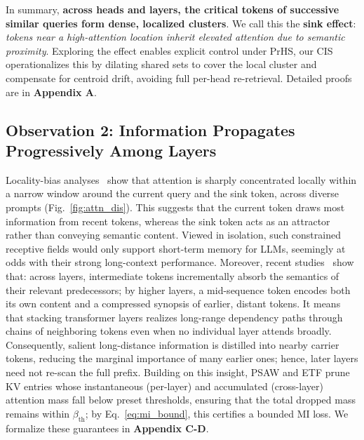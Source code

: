 In summary, \textbf{across heads and layers, the critical tokens of successive similar queries form dense, localized clusters}. We call this the \textbf{sink effect}: \textit{tokens near a high-attention location inherit elevated attention due to semantic proximity}. Exploring the effect enables explicit control under PrHS, our CIS operationalizes this by dilating shared sets to cover the local cluster and compensate for centroid drift, avoiding full per-head re-retrieval. Detailed proofs are in \textbf{Appendix A}.



\subsection{Observation 2: Information Propagates Progressively Among Layers}

Locality-bias analyses~\cite{zhang2023h2o,ge2023fastgen} show that attention is
sharply concentrated locally within a narrow window around the current query
and the sink token, across diverse prompts (Fig.~\ref{fig:attn_dis}).
This suggests that the current token draws most information from recent tokens,
whereas the sink token acts as an attractor rather than conveying semantic content.
Viewed in isolation, such constrained receptive fields would only support short-term memory for LLMs, seemingly at odds with their strong long-context performance.
Moreover, recent studies~\cite{cai2024pyramidkv,wan2024d2o,gao2023empower} show that:
across layers, intermediate tokens incrementally absorb the semantics of their relevant predecessors; by higher layers, a mid-sequence token encodes both its own content and a compressed synopsis of earlier, distant tokens.
It means that stacking transformer layers realizes long-range dependency paths through chains of neighboring tokens even when no individual layer attends broadly.
Consequently, salient long-distance information is distilled into nearby carrier
tokens, reducing the marginal importance of many earlier ones; hence,
later layers need not re-scan the full prefix.
Building on this insight, PSAW and ETF prune KV entries whose instantaneous (per-layer) and accumulated (cross-layer) attention mass fall below preset thresholds, ensuring that the total dropped mass remains within $\beta_{\mathrm{th}}$; by Eq.~\eqref{eq:mi_bound}, this certifies a bounded MI loss.
We formalize these guarantees in \textbf{Appendix C-D}.



